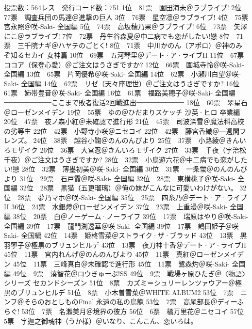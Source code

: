     投票数：564レス　発行コード数：751
    1位　81票　園田海未＠ラブライブ!
    2位　77票　調査兵団の馬達＠進撃の巨人
    3位　76票　星空凛＠ラブライブ!
    4位　75票　宮永照＠咲-Saki- 全国編
    5位　74票　高坂穂乃果＠ラブライブ!
    6位　73票　矢澤にこ＠ラブライブ!
    7位　72票　丹生谷森夏＠中二病でも恋がしたい!戀
    8位　71票　三千院ナギ＠ハヤテのごとく!
    8位　71票　中川かのん（アポロ）＠神のみぞ知るセカイ 女神篇
    10位　69票　五河琴里＠デート·ア·ライブII
    11位　67票　ココア（保登心愛）＠ご注文はうさぎですか?
    12位　66票　園城寺怜＠咲-Saki- 全国編
    13位　65票　片岡優希＠咲-Saki- 全国編
    14位　62票　小瀬川白望＠咲-Saki- 全国編
    14位　62票　リゼ（天々座理世）＠ご注文はうさぎですか?
    16位　61票　姉帯豊音＠咲-Saki- 全国編
    16位　61票　福路美穂子＠咲-Saki- 全国編
    ━━━━━━━ここまで敗者復活2回戦進出━━━━━━━
    18位　60票　翠星石＠ローゼンメイデン
    19位　55票　ゆの＠ひだまりスケッチ 沙英·ヒロ 卒業編
    20位　47票　夜ノ森小紅＠未確認で進行形
    21位　45票　司波深雪＠魔法科高校の劣等生
    22位　42票　小野寺小咲＠ニセコイ
    22位　42票　藤宮香織＠一週間フレンズ。
    24位　38票　越谷小鞠＠のんのんびより
    25位　37票　小路綾＠きんいろモザイク
    26位　36票　大宮忍＠きんいろモザイク
    27位　33票　千夜（宇治松千夜）＠ご注文はうさぎですか?
    28位　32票　小鳥遊六花＠中二病でも恋がしたい!戀
    28位　32票　薄墨初美＠咲-Saki- 全国編
    30位　31票　一条蛍＠のんのんびより
    31位　29票　石戸霞＠咲-Saki- 全国編
    32位　28票　東横桃子＠咲-Saki- 全国編
    32位　28票　黒猫（五更瑠璃）＠俺の妹がこんなに可愛いわけがない。
    32位　28票　夢乃マホ＠咲-Saki- 全国編
    35位　25票　四糸乃＠デート·ア·ライブII
    36位　24票　水銀燈＠ローゼンメイデン
    37位　23票　上重漫＠咲-Saki- 全国編
    38位　20票　白＠ノーゲーム·ノーライフ
    39位　17票　瑞原はやり＠咲-Saki- 全国編
    39位　17票　龍門渕透華＠咲-Saki- 全国編
    39位　17票　鶴田姫子＠咲-Saki- 全国編
    42位　14票　姫柊雪菜＠ストライク·ザ·ブラッド
    43位　13票　黒羽寧子＠極黒のブリュンヒルデ
    43位　13票　夜刀神十香＠デート·ア·ライブII
    45位　11票　宮内れんげ＠のんのんびより
    45位　11票　真紅＠ローゼンメイデン
    45位　11票　三峰真白＠未確認で進行形
    45位　11票　鷺森灼＠咲-Saki- 全国編
    49位　9票　湊智花＠ロウきゅーぶ!SS
    49位　9票　戦場ヶ原ひたぎ＠〈物語〉シリーズ セカンドシーズン
    51位　8票　カズミ＝シュリーレンツァウアー＠極黒のブリュンヒルデ
    51位　8票　小木曽雪菜＠WHITE ALBUM2
    53位　7票　ニンフ＠そらのおとしものFinal 永遠の私の鳥籠
    53位　7票　高尾部長＠ディーふらぐ!
    53位　7票　名瀬美月＠境界の彼方
    56位　6票　橘万里花＠ニセコイ
    57位　5票　宇迦之御魂神（うか様）＠いなり、こんこん、恋いろは。
